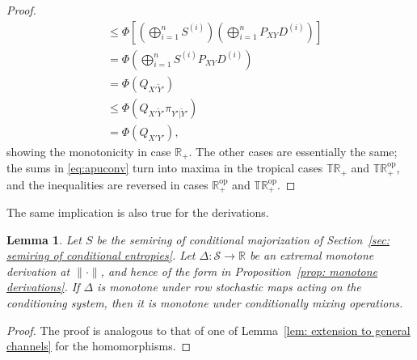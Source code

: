 \documentclass[aps,pra,11pt,onecolumn,nofootinbib,tightenlines]{revtex4-2}
\newtheorem{lemma}[theorem]{Lemma}
\theoremstyle{definition}
\begin{document}
\begin{proof}
\begin{align}
&\leq\Phi\left[\left(\bigoplus_{i=1}^n S^{(i)}\right)\left(\bigoplus_{i=1}^n P_{XY}D^{(i)}\right)\right]\\
&=\Phi\left(\bigoplus_{i=1}^n S^{(i)}P_{XY}D^{(i)}\right)\\
&=\Phi(Q_{X'\widetilde{Y}'})\\
&\leq\Phi(Q_{X'\widetilde{Y}'}\pi_{Y'|\widetilde{Y}'})\\
&=\Phi(Q_{X'Y'}),
\end{align}
showing the monotonicity in case $\mathbb{R}_+$. The other cases are essentially the same; the sums in \eqref{eq:apuconv} turn into maxima in the tropical cases $\mathbb{TR}_+$ and $\mathbb{TR}^{\mathrm{op}}_+$, and the inequalities are reversed in cases $\mathbb{R}^{\mathrm{op}}_+$ and $\mathbb{TR}^{\mathrm{op}}_+$.
\end{proof}
The same implication is also true for the derivations.
\begin{lemma}
Let $S$ be the semiring of conditional majorization of Section~\ref{sec: semiring of conditional entropies}. Let $\Delta: \mathcal{S} \to \mathbb{R}$ be an extremal monotone derivation at $\|\cdot\|$, and hence of the form in Proposition~\ref{prop: monotone derivations}.
If $\Delta$ is monotone under row stochastic maps acting on the conditioning system, then it is monotone under conditionally mixing operations.
\end{lemma}
\begin{proof}
    The proof is analogous to that of one of Lemma~\ref{lem: extension to general channels} for the homomorphisms.
\end{proof}




\appendix
\end{document}
